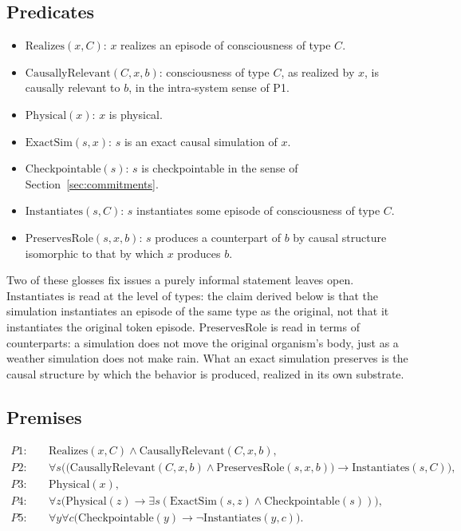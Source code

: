 \documentclass[11pt]{article}
\begin{document}
\subsection*{Predicates}

\begin{itemize}
  \item \(\mathrm{Realizes}(x,C)\): \(x\) realizes an episode of consciousness
        of type \(C\).
  \item \(\mathrm{CausallyRelevant}(C,x,b)\): consciousness of type \(C\), as
        realized by \(x\), is causally relevant to \(b\), in the intra-system
        sense of P1.
  \item \(\mathrm{Physical}(x)\): \(x\) is physical.
  \item \(\mathrm{ExactSim}(s,x)\): \(s\) is an exact causal simulation of
        \(x\).
  \item \(\mathrm{Checkpointable}(s)\): \(s\) is checkpointable in the sense of
        Section~\ref{sec:commitments}.
  \item \(\mathrm{Instantiates}(s,C)\): \(s\) instantiates some episode of
        consciousness of type \(C\).
  \item \(\mathrm{PreservesRole}(s,x,b)\): \(s\) produces a counterpart of
        \(b\) by causal structure isomorphic to that by which \(x\) produces
        \(b\).
\end{itemize}

\noindent
Two of these glosses fix issues a purely informal statement leaves open.
\(\mathrm{Instantiates}\) is read at the level of types: the claim derived
below is that the simulation instantiates an episode of the same type as the
original, not that it instantiates the original token episode.
\(\mathrm{PreservesRole}\) is read in terms of counterparts: a simulation does
not move the original organism's body, just as a weather simulation does not
make rain. What an exact simulation preserves is the causal structure by which
the behavior is produced, realized in its own substrate.

\subsection*{Premises}

\begin{align*}
  P1:\quad & \mathrm{Realizes}(x,C)\land \mathrm{CausallyRelevant}(C,x,b), \\
  P2:\quad & \forall s\bigl(\bigl(\mathrm{CausallyRelevant}(C,x,b)\land
  \mathrm{PreservesRole}(s,x,b)\bigr)\to \mathrm{Instantiates}(s,C)\bigr), \\
  P3:\quad & \mathrm{Physical}(x),                                         \\
  P4:\quad & \forall z\bigl(\mathrm{Physical}(z)\to
  \exists s(\mathrm{ExactSim}(s,z)\land \mathrm{Checkpointable}(s))\bigr), \\
  P5:\quad & \forall y\forall c\bigl(\mathrm{Checkpointable}(y)\to
  \neg \mathrm{Instantiates}(y,c)\bigr).
\end{align*}
\end{document}
